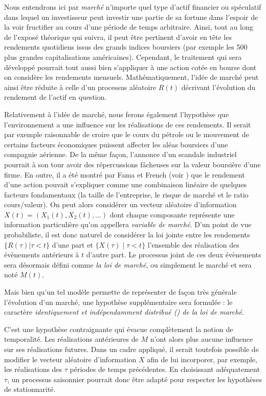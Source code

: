 Nous entendrons ici par \textit{marché} n'importe quel type d'actif financier ou
spéculatif dans lequel un investisseur peut investir une partie de sa fortune dans
l'espoir de la voir fructifier au cours d'une période de temps arbitraire. Ainsi, tout au
long de l'exposé théorique qui suivra, il peut être pertinent d'avoir en tête les
rendements quotidiens issus des grands indices boursiers (par exemple les 500 plus grandes
capitalisations américaines). Cependant, le traitement qui sera développé pourrait tout
aussi bien s'appliquer à une action cotée en bourse dont on considère les rendements
mensuels.  Mathématiquement, l'idée de marché peut ainsi être réduite à celle d'un
processus aléatoire $R(t)$ décrivant l'évolution du rendement de l'actif en question.

Relativement à l'idée de marché, nous ferons également l'hypothèse que l'environnement a
une influence sur les réalisations de ces rendements. Il serait par exemple raisonnable de
croire que le cours du pétrole ou le mouvement de certains facteurs économiques puissent
affecter les aléas boursiers d'une compagnie aérienne. De la même façon, l'annonce d'un
scandale industriel pourrait à son tour avoir des répercussions fâcheuses sur la valeur
boursière d'une firme. En outre, il a été montré par Fama et French (voir
\cite{fama1996multifactor}) que le rendement d'une action pouvait s'expliquer comme une
combinaison linéaire de quelques facteurs fondamentaux (la taille de l'entreprise, le
risque de marché et le ratio cours/valeur). On peut alors considérer un vecteur aléatoire
d'information $X(t) = (X_1(t), X_2(t), \dots)$ dont chaque composante représente une
information particulière qu'on appellera \textit{variable de marché}. D'un point de vue
probabiliste, il est donc naturel de considérer la loi jointe entre les rendements
$\{R(\tau) | \tau < t\}$ d'une part et $\{X(\tau) \mid \tau < t\}$ l'ensemble des réalisation des
évènements antérieurs à $t$ d'autre part. Le processus joint de ces deux évènements sera
désormais défini comme \textit{la loi de marché}, ou simplement le marché et sera noté
$M(t)$.


Mais bien qu'un tel modèle permette de représenter de façon très générale l'évolution d'un
marché, une hypothèse supplémentaire sera formulée : le caractère \textit{identiquement et
  indépendamment distribué (\iid) de la loi de marché}.

C'est une hypothèse contraignante qui évacue complètement la notion de temporalité. Les
réalisations antérieures de $M$ n'ont alors plus aucune influence sur ses réalisations
futures. Dans un cadre appliqué, il serait toutefois possible de modifier le vecteur
aléatoire d'information $X$ afin de lui incorporer, par exemple, les réalisations des
$\tau$ périodes de temps précédentes. En choisissant adéquatement $\tau$, un processus
saisonnier pourrait donc être adapté pour respecter les hypothèses de stationnarité.


